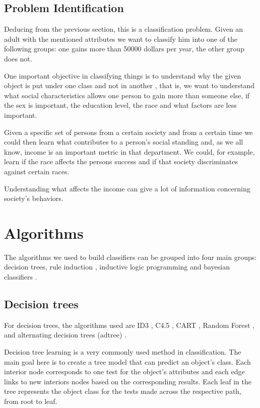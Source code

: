 \documentclass[a4paper]{llncs}
\begin{document}
\subsection{Problem Identification}

Deducing from the previous section, this is a classification problem. Given an adult
with the mentioned attributes we want to classify him into one of the following groups:
one gains more than 50000 dollars per year, the other group does not.

One important objective in classifying things is to understand why the given object
is put under one class and not in another \cite{2}\cite{3}, that is, we want to understand what social characteristics
allows one person to gain more than someone else, if the sex is important, the education level,
the race and what factors are less important.

Given a specific set of persons from a certain society and from a certain time we could then
learn what contributes to a person's social standing and, as we all know, income is an important
metric in that department. We could, for example, learn if the race affects the persons success and if
that society discriminates against certain races.

Understanding what affects the income can give a lot of information concerning society's behaviors.

\section{Algorithms} \label{sec:algs}

The algorithms we used to build classifiers can be grouped into four main
groups: decision trees, rule induction \cite{rule_induction},
inductive logic programming and bayesian classifiers \cite{bayes}.

\subsection{Decision trees}

For decision trees, the algorithms used are ID3 \cite{id3}, C4.5 \cite{c45}, CART \cite{cart},
Random Forest \cite{random_forest}, and alternating decision trees (adtree) \cite{adtree}.

Decision tree learning is a very commonly used method in classification. The main goal here is to
create a tree model that can predict an object's class. Each interior node corresponds
to one test for the object's attributes and each edge links to new interiors nodes based on the corresponding
results. Each leaf in the tree represents the object class for the tests made
across the respective path, from root to leaf.
\end{document}
